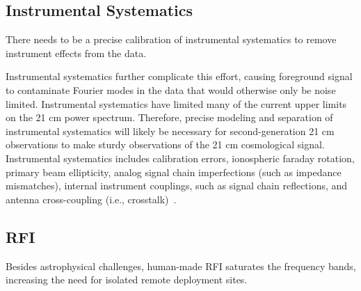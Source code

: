 	    \subsection*{Instrumental Systematics}

            
	    There needs to be a precise calibration of instrumental systematics to remove instrument effects from the data.
	    
	    Instrumental systematics further complicate this effort, causing foreground signal to contaminate Fourier modes in the data that would otherwise only be noise limited. Instrumental systematics have limited many of the current upper limits on the 21 cm power spectrum. Therefore, precise modeling and separation of instrumental systematics will likely be necessary for second-generation 21 cm observations to make sturdy observations of the 21 cm cosmological signal. Instrumental systematics includes calibration errors, ionospheric faraday rotation, primary beam ellipticity, analog signal chain imperfections (such as impedance mismatches), internal instrument couplings, such as signal chain reflections, and antenna cross-coupling (i.e., crosstalk)~\citep{2020ApJ...888...70K}.
	    
	    
	    
	    \subsection*{RFI}
	    
	    Besides astrophysical challenges, human-made RFI saturates the frequency bands, increasing the need for isolated remote deployment sites. 
	    

